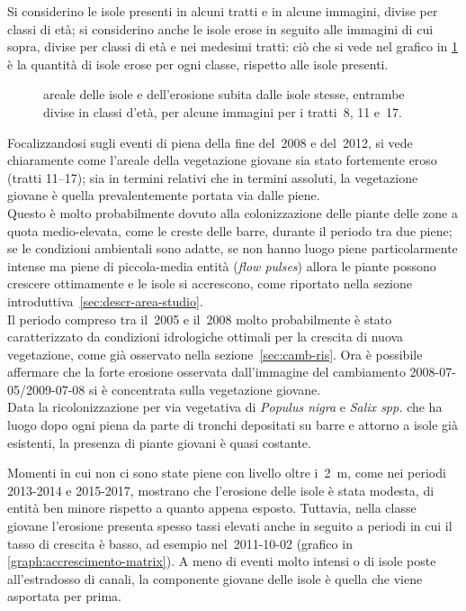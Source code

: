 Si considerino le isole presenti in alcuni tratti e in alcune immagini, divise per classi di età; si considerino anche le isole erose in seguito alle immagini di cui sopra, divise per classi di età e nei medesimi tratti: ciò che si vede nel grafico in \cref{graph:distr-eta} è la quantità di isole erose per ogni classe, rispetto alle isole presenti. 
%
\begin{figure}
	\centering
	
	\caption[areale delle isole e dell'erosione subita divise in classi d'età per i tratti~8, 11 e~17]{areale delle isole e dell'erosione subita dalle isole stesse, entrambe divise in classi d'età, per alcune immagini per i tratti~8, 11 e~17.}
	\label{graph:distr-eta}
\end{figure}
%
Focalizzandosi sugli eventi di piena della fine del~2008 e del~2012, si vede chiaramente come l'areale della vegetazione giovane sia stato fortemente eroso (tratti \numrange[range-phrase={ e }]{11}{17});
sia in termini relativi che in termini assoluti, la vegetazione giovane è quella prevalentemente portata via dalle piene.
\\
Questo è molto probabilmente dovuto alla colonizzazione delle piante delle zone a quota medio-elevata, come le creste delle barre, durante il periodo tra due piene; 
se le condizioni ambientali sono adatte, se non hanno luogo piene particolarmente intense ma piene di piccola-media entità (\emph{flow pulses}) allora le piante possono crescere ottimamente e le isole si accrescono, come riportato nella sezione introduttiva~\ref{sec:descr-area-studio}.
\\
Il periodo compreso tra il~2005 e il~2008 molto probabilmente è stato caratterizzato da condizioni idrologiche ottimali per la crescita di nuova vegetazione, come già osservato nella sezione~\ref{sec:camb-ris}.
Ora è possibile affermare che la forte erosione osservata dall'immagine del cambiamento 2008-07-05/2009-07-08 si è concentrata sulla vegetazione giovane.
\\
Data la ricolonizzazione per via vegetativa di \emph{Populus nigra} e \emph{Salix spp.} che ha luogo dopo ogni piena da parte di tronchi depositati su barre e attorno a isole già esistenti, la presenza di piante giovani è quasi costante.

Momenti in cui non ci sono state piene con livello oltre i~\SI{2}{\m}, come nei periodi 2013-2014 e 2015-2017, mostrano che l'erosione delle isole è stata modesta, di entità ben minore rispetto a quanto appena esposto. Tuttavia, nella classe giovane l'erosione presenta spesso tassi elevati anche in seguito a periodi in cui il tasso di crescita è basso, ad esempio nel~2011-10-02 (grafico in \cref{graph:accrescimento-matrix}).
A meno di eventi molto intensi o di isole poste all'estradosso di canali, la componente giovane delle isole è quella che viene asportata per prima.

